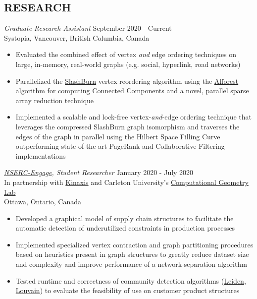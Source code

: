 \documentclass[margin]{res}
\begin{document}
\begin{resume}
      \section{RESEARCH}
       {\sl Graduate Research Assistant} \hfill September 2020 - Current \\
      Systopia, Vancouver, British Columbia, Canada
      \begin{itemize}  \itemsep -2pt
            \item{Evaluated the combined effect of vertex \textit{and} edge ordering techniques on large, in-memory, real-world graphs (e.g. social, hyperlink, road networks)}
            \item{Parallelized the \href{https://ieeexplore.ieee.org/document/6807798}{SlashBurn} vertex reordering algorithm using the \href{https://github.com/michaelsutton/afforest}{Afforest} algorithm for computing Connected Components and a novel, parallel sparse array reduction technique}
            \item{Implemented a scalable and lock-free vertex-\textit{and}-edge ordering technique that leverages the compressed SlashBurn graph isomorphism and traverses the edges of the graph in parallel using the Hilbert Space Filling Curve outperforming state-of-the-art PageRank and Collaborative Filtering implementations}
      \end{itemize}
      {\sl \href{https://www.nserc-crsng.gc.ca/Professors-Professeurs/RPP-PP/Engage-engagement_eng.asp}{NSERC-Engage}, Student Researcher} \hfill January 2020 - July 2020 \\
      In partnership with \href{https://www.kinaxis.com/en}{Kinaxis} and Carleton University's \href{https://cglab.ca/}{Computational Geometry Lab}\\
      Ottawa, Ontario, Canada
      \begin{itemize}  \itemsep -2pt
            \item{Developed a graphical model of supply chain structures to facilitate the automatic detection of underutilized constraints in production processes}
            \item{Implemented specialized vertex contraction and graph partitioning procedures based on heuristics present in graph structures to greatly reduce dataset size and complexity and improve performance of a network-separation algorithm}
            \item{Tested runtime and correctness of community detection algorithms (\href{https://www.nature.com/articles/s41598-019-41695-z.pdf}{Leiden}, \href{https://arxiv.org/pdf/0803.0476.pdf}{Louvain}) to evaluate the feasibility of use on customer product structures}
      \end{itemize}

\end{resume}
\end{document}
